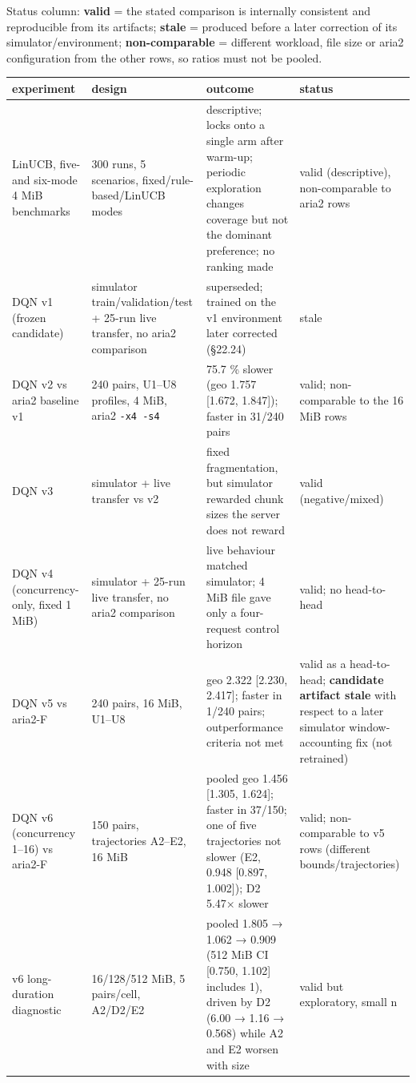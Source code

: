 \documentclass[conference]{IEEEtran}
\begin{document}
Status column: \textbf{valid} = the stated comparison is internally consistent and reproducible from its artifacts; \textbf{stale} = produced before a later correction of its simulator/environment; \textbf{non-comparable} = different workload, file size or aria2 configuration from the other rows, so ratios must not be pooled.


\begin{table}[!t]\centering\footnotesize
\begin{tabularx}{\textwidth}{@{}LLLL@{}}
\toprule
\textbf{experiment} & \textbf{design} & \textbf{outcome} & \textbf{status}\\
\midrule
LinUCB, five- and six-mode 4 MiB benchmarks & 300 runs, 5 scenarios, fixed/rule-based/LinUCB modes & descriptive; locks onto a single arm after warm-up; periodic exploration changes coverage but not the dominant preference; no ranking made & valid (descriptive), non-comparable to aria2 rows\\
DQN v1 (frozen candidate) & simulator train/validation/test + 25-run live transfer, no aria2 comparison & superseded; trained on the v1 environment later corrected (§22.24) & stale\\
DQN v2 vs aria2 baseline v1 & 240 pairs, U1–U8 profiles, 4 MiB, aria2 \texttt{-x4 -s4} & 75.7 \% slower (geo 1.757 [1.672, 1.847]); faster in 31/240 pairs & valid; non-comparable to the 16 MiB rows\\
DQN v3 & simulator + live transfer vs v2 & fixed fragmentation, but simulator rewarded chunk sizes the server does not reward & valid (negative/mixed)\\
DQN v4 (concurrency-only, fixed 1 MiB) & simulator + 25-run live transfer, no aria2 comparison & live behaviour matched simulator; 4 MiB file gave only a four-request control horizon & valid; no head-to-head\\
DQN v5 vs aria2-F & 240 pairs, 16 MiB, U1–U8 & geo 2.322 [2.230, 2.417]; faster in 1/240 pairs; outperformance criteria not met & valid as a head-to-head; \textbf{candidate artifact stale} with respect to a later simulator window-accounting fix (not retrained)\\
DQN v6 (concurrency 1–16) vs aria2-F & 150 pairs, trajectories A2–E2, 16 MiB & pooled geo 1.456 [1.305, 1.624]; faster in 37/150; one of five trajectories not slower (E2, 0.948 [0.897, 1.002]); D2 5.47× slower & valid; non-comparable to v5 rows (different bounds/trajectories)\\
v6 long-duration diagnostic & 16/128/512 MiB, 5 pairs/cell, A2/D2/E2 & pooled 1.805 → 1.062 → 0.909 (512 MiB CI [0.750, 1.102] includes 1), driven by D2 (6.00 → 1.16 → 0.568) while A2 and E2 worsen with size & valid but exploratory, small n\\
\bottomrule
\end{tabularx}
\end{table}
\end{document}
